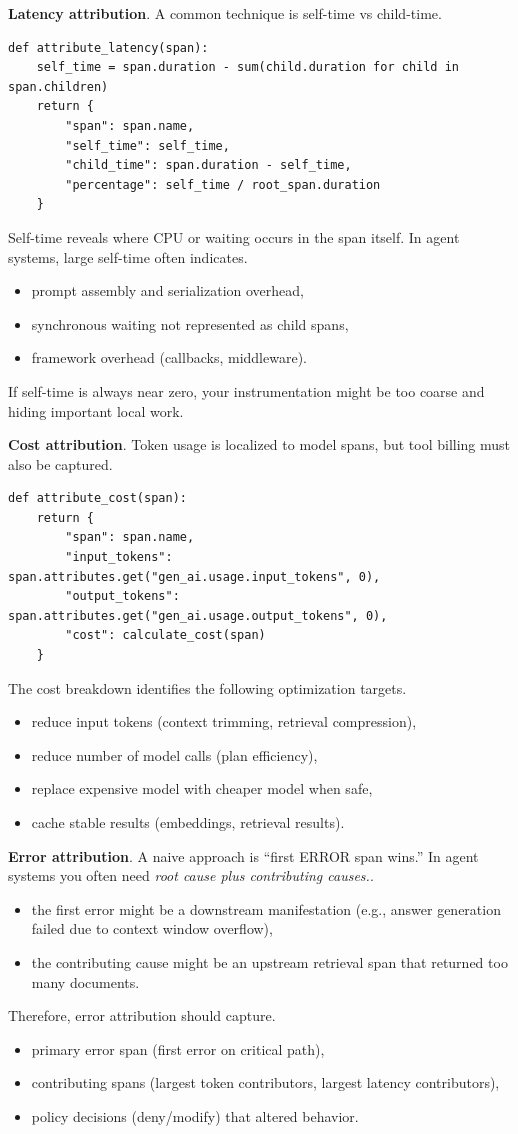 \textbf{Latency attribution}. A common technique is self-time vs child-time. {\footnotesize{\footnotesize
\begin{verbatim}
def attribute_latency(span):
    self_time = span.duration - sum(child.duration for child in span.children)
    return {
        "span": span.name,
        "self_time": self_time,
        "child_time": span.duration - self_time,
        "percentage": self_time / root_span.duration
    }
\end{verbatim}
}}
Self-time reveals where CPU or waiting occurs in the span itself. In agent systems, large self-time often indicates.
\begin{itemize}
\item prompt assembly and serialization overhead,
\item synchronous waiting not represented as child spans,
\item framework overhead (callbacks, middleware).
\end{itemize}
If self-time is always near zero, your instrumentation might be too coarse and hiding important local work.

\textbf{Cost attribution}. Token usage is localized to model spans, but tool billing must also be captured. {\footnotesize{\footnotesize
\begin{verbatim}
def attribute_cost(span):
    return {
        "span": span.name,
        "input_tokens": span.attributes.get("gen_ai.usage.input_tokens", 0),
        "output_tokens": span.attributes.get("gen_ai.usage.output_tokens", 0),
        "cost": calculate_cost(span)
    }
\end{verbatim}
}}
The cost breakdown identifies the following optimization targets.
\begin{itemize}
\item reduce input tokens (context trimming, retrieval compression),
\item reduce number of model calls (plan efficiency),
\item replace expensive model with cheaper model when safe,
\item cache stable results (embeddings, retrieval results).
\end{itemize}

\textbf{Error attribution}. A naive approach is ``first ERROR span wins.'' In agent systems you often need \emph{root cause plus contributing causes.}.
\begin{itemize}
\item the first error might be a downstream manifestation (e.g., answer generation failed due to context window overflow),
\item the contributing cause might be an upstream retrieval span that returned too many documents.
\end{itemize}
Therefore, error attribution should capture.
\begin{itemize}
\item primary error span (first error on critical path),
\item contributing spans (largest token contributors, largest latency contributors),
\item policy decisions (deny/modify) that altered behavior.
\end{itemize}

